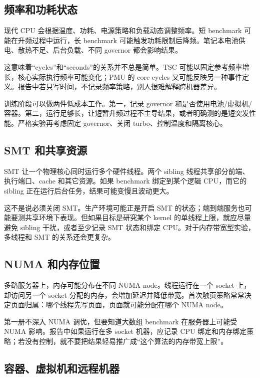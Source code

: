 \subsection{频率和功耗状态}

现代 CPU 会根据温度、功耗、电源策略和负载动态调整频率。短 benchmark 可能在升频过程中运行，长 benchmark 可能触发功耗限制后降频。笔记本电池供电、散热不足、后台负载、不同 governor 都会影响结果。

这意味着“cycles”和“seconds”的关系并不总是简单。TSC 可能以固定参考频率增长，核心实际执行频率可能变化；PMU 的 core cycles 又可能反映另一种事件定义。报告中若只写时间，不记录频率策略，别人很难解释跨机器差异。

训练阶段可以做两件低成本工作。第一，记录 governor 和是否使用电池/虚拟机/容器。第二，运行足够长，让短暂升频过程不主导结果，或者明确测的是短突发性能。严格实验再考虑固定 governor、关闭 turbo、控制温度和隔离核心。

\subsection{SMT 和共享资源}

SMT 让一个物理核心同时运行多个硬件线程。两个 sibling 线程共享部分前端、执行端口、cache 和其它资源。如果 benchmark 绑定到某个逻辑 CPU，而它的 sibling 正在运行后台任务，结果可能变慢且波动更大。

这不是说必须关闭 SMT。生产环境可能正是开启 SMT 的状态；端到端服务也可能要测共享环境下表现。但如果目标是研究某个 kernel 的单线程上限，就应尽量避免 sibling 干扰，或者至少记录 SMT 状态和绑定 CPU。对于内存带宽型实验，多线程和 SMT 的关系还会更复杂。

\subsection{NUMA 和内存位置}

多路服务器上，内存可能分布在不同 NUMA node。线程运行在一个 socket 上，却访问另一个 socket 分配的内存，会增加延迟并降低带宽。首次触页策略常常决定页面归属：哪个线程先写页面，页面就可能分配在哪个 NUMA node。

第一册不深入 NUMA 调优，但要知道大数组 benchmark 在服务器上可能受 NUMA 影响。报告中如果运行在多 socket 机器，应记录 CPU 绑定和内存绑定策略；若没有控制，就不要把结果轻易推广成“这个算法的内存带宽上限”。

\subsection{容器、虚拟机和远程机器}

